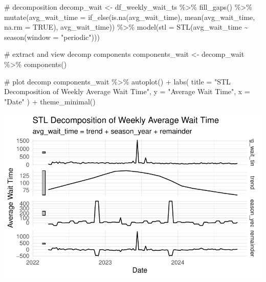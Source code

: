 \documentclass[
  letterpaper,
  DIV=11,
  numbers=noendperiod]{scrartcl}
\newenvironment{Shaded}{\begin{snugshade}}{\end{snugshade}}
\newcommand{\AttributeTok}[1]{\textcolor[rgb]{0.40,0.45,0.13}{#1}}
\newcommand{\CommentTok}[1]{\textcolor[rgb]{0.37,0.37,0.37}{#1}}
\newcommand{\ConstantTok}[1]{\textcolor[rgb]{0.56,0.35,0.01}{#1}}
\newcommand{\FunctionTok}[1]{\textcolor[rgb]{0.28,0.35,0.67}{#1}}
\newcommand{\NormalTok}[1]{\textcolor[rgb]{0.00,0.23,0.31}{#1}}
\newcommand{\OtherTok}[1]{\textcolor[rgb]{0.00,0.23,0.31}{#1}}
\newcommand{\SpecialCharTok}[1]{\textcolor[rgb]{0.37,0.37,0.37}{#1}}
\newcommand{\StringTok}[1]{\textcolor[rgb]{0.13,0.47,0.30}{#1}}
\begin{document}
\begin{Shaded}
\begin{Highlighting}[]
\CommentTok{\# decomposition}
\NormalTok{decomp\_wait }\OtherTok{\textless{}{-}}\NormalTok{ df\_weekly\_wait\_ts }\SpecialCharTok{\%\textgreater{}\%}
  \FunctionTok{fill\_gaps}\NormalTok{() }\SpecialCharTok{\%\textgreater{}\%}
  \FunctionTok{mutate}\NormalTok{(}\AttributeTok{avg\_wait\_time =} \FunctionTok{if\_else}\NormalTok{(}\FunctionTok{is.na}\NormalTok{(avg\_wait\_time), }\FunctionTok{mean}\NormalTok{(avg\_wait\_time, }\AttributeTok{na.rm =} \ConstantTok{TRUE}\NormalTok{), avg\_wait\_time)) }\SpecialCharTok{\%\textgreater{}\%}
  \FunctionTok{model}\NormalTok{(}\AttributeTok{stl =} \FunctionTok{STL}\NormalTok{(avg\_wait\_time }\SpecialCharTok{\textasciitilde{}} \FunctionTok{season}\NormalTok{(}\AttributeTok{window =} \StringTok{"periodic"}\NormalTok{)))}

\CommentTok{\# extract and view decomp components}
\NormalTok{components\_wait }\OtherTok{\textless{}{-}}\NormalTok{ decomp\_wait }\SpecialCharTok{\%\textgreater{}\%}
  \FunctionTok{components}\NormalTok{()}

\CommentTok{\# plot decomp}
\NormalTok{components\_wait }\SpecialCharTok{\%\textgreater{}\%}
  \FunctionTok{autoplot}\NormalTok{() }\SpecialCharTok{+} 
  \FunctionTok{labs}\NormalTok{(}
    \AttributeTok{title =} \StringTok{"STL Decomposition of Weekly Average Wait Time"}\NormalTok{, }
    \AttributeTok{y =} \StringTok{"Average Wait Time"}\NormalTok{, }
    \AttributeTok{x =} \StringTok{"Date"}
\NormalTok{  ) }\SpecialCharTok{+}
  \FunctionTok{theme\_minimal}\NormalTok{()}
\end{Highlighting}
\end{Shaded}

\includegraphics{final_proj_group1_files/figure-pdf/aggregate_weekly-3.pdf}
\end{document}
